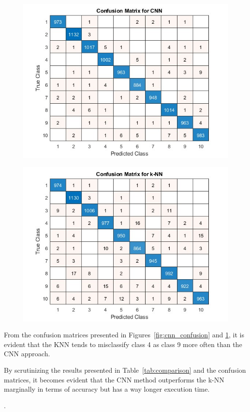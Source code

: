 \begin{figure}[ht]
    \centering
    \begin{minipage}{.5\textwidth}
        \centering
        \includegraphics[width=.9\linewidth]{c_mat_cnn.jpg} 
        \label{fig:cnn_confusion}
    \end{minipage}%
    \begin{minipage}{.5\textwidth}
        \centering
        \includegraphics[width=.9\linewidth]{c_mat_knn.jpg} 
        \label{fig:knn_confusion}
    \end{minipage}
\end{figure}

From the confusion matrices presented in Figures~\ref{fig:cnn_confusion} and \ref{fig:knn_confusion}, it is evident that the KNN tends to misclassify class 4 as class 9 more often than the CNN approach.

By scrutinizing the results presented in Table~\ref{tab:comparison} and the confusion matrices, it becomes evident that the CNN method outperforms the k-NN  marginally in terms of accuracy but has a way longer execution time.

.
